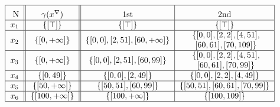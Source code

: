 \begin{example}
\begin{table}[H]
\begin{minipage}{\textwidth}
\[\begin{tabular}{|c||c||c|c|}
        \hline 
        \rule{0pt}{14pt} 
        N &  
        \(\gamma(x^{\nabla})\) & 
        1st & 2nd \\
        \hline
        $x_1$ & $\{\left[\top\right]\}$ 
        & $\{\left[\top\right]\}$ & $\{\left[\top\right]\}$ \\
        \hline
        $x_2$ & $\{\left[0, +\infty\right]\}$ 
        & $\{[0, 0], [2, 51], \left[60, +\infty\right]\}$  & \specialcell{$\{[0, 0], [2, 2], [4, 51],$\\$ [60, 61], [70, 109]\}$} \\
        \hline
        $x_3$ & $\{\left[0, +\infty\right]\}$ 
        & $\{[0, 0], [2, 51], [60, 99]\}$ & \specialcell{$\{[0, 0], [2, 2], [4, 51],$\\$[60, 61], [70, 99]\}$} \\
        \hline
        $x_4$ & $\{\left[0, 49\right]\}$ 
        & $\{[0, 0], [2, 49]\}$& $\{[0, 0], [2, 2], [4, 49]\}$ \\
        \hline
        $x_5$ & $\{\left[50, +\infty\right]\}$ 
        & $\{[50, 51], [60, 99]\}$& $\{[50, 51], [60, 61], [70, 99]\}$ \\
        \hline
        $x_6$ & $\{\left[100, +\infty\right]\}$
        & $\{[100, +\infty]\}$& $\{[100, 109]\}$ \\
        \hline
        \end{tabular}
        \]
    \end{minipage}
    \caption{Tabella dei risultati del dominio \(\textrm{Int}\uparrow\downarrow\widehat{\textrm{Int}}\) divisi per step e fase.}
    \label{fig:risDecSingInt}
\end{table}
\end{example}